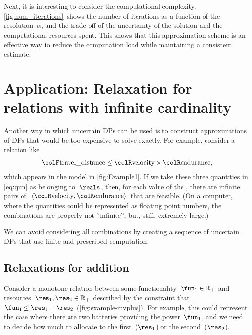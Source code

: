 Next, it is interesting to consider the computational complexity.
\cref{fig:num_iterations}~shows the number of iterations as
a function of the resolution~$\alpha$, and the trade-off of the
uncertainty of the solution and the computational resources spent.
This shows that this approximation scheme is an effective way to reduce
the computation load while maintaining a consistent estimate.

\section{Application: Relaxation for relations with infinite cardinality\label{sec:Application-relax}}

Another way in which uncertain DPs can be used is to construct approximations
of DPs that would be too expensive to solve exactly. For example,
consider a relation like
\begin{equation}
{\colF\text{travel\_distance}}
  \leq{\colR\text{velocity}}\times{\colR\text{endurance}},\label{eq:qun}
\end{equation}
which appears in the model in \cref{fig:Example1}. If we take
these three quantities in \cref{eq:qun} as belonging to~$\reals$,
then, for each value of the , there are infinite
pairs of~$\left\langle {\colR\text{velocity}},{\colR\text{endurance}}\right\rangle $
that are feasible. (On a computer, where the quantities could be represented
as floating point numbers, the combinations are properly not ``infinite'',
but, still, extremely large.)

We can avoid considering all combinations by creating a sequence of
uncertain DPs that use finite and prescribed computation.

\subsection{Relaxations for addition}

Consider a monotone relation between some functionality~$\fun_{1}\in\mathbb{R}_{+}$
and resources~$\res_{1},\res_{2}\in\mathbb{R}_{+}$ described by
the constraint that~$\fun_{1}\leq\res_{1}+\res_{2}$ (\cref{fig:example-invplus}).
For example, this could represent the case where there are two batteries
providing the power~$\fun_{1}$, and we need to decide how much to
allocate to the first~($\res_{1}$) or the second~($\res_{2}$).


